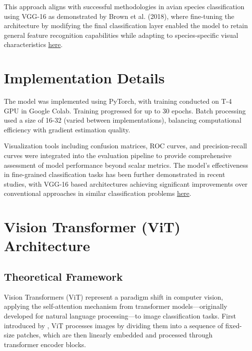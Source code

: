 \documentclass[a4paper,12pt]{article}
\begin{document}
This approach aligns with successful methodologies in avian species classification using VGG-16 as demonstrated by Brown et al. (2018), where fine-tuning the architecture by modifying the final classification layer enabled the model to retain general feature recognition capabilities while adapting to species-specific visual characteristics \href{https://ieeexplore.ieee.org/stamp/stamp.jsp?tp=&arnumber=10533638&tag=}{here}.


\section{Implementation Details}
The model was implemented using PyTorch, with training conducted on T-4 GPU in Google Colab. Training progressed for up to 30 epochs. Batch processing used a size of 16-32 (varied between implementations), balancing computational efficiency with gradient estimation quality.

Visualization tools including confusion matrices, ROC curves, and precision-recall curves were integrated into the evaluation pipeline to provide comprehensive assessment of model performance beyond scalar metrics. The model's effectiveness in fine-grained classification tasks has been further demonstrated in recent studies, with VGG-16 based architectures achieving significant improvements over conventional approaches in similar classification problems \href{https://ieeexplore.ieee.org/stamp/stamp.jsp?tp=&arnumber=10648677&tag=1}{here}.




\section{Vision Transformer (ViT) Architecture}

\subsection{Theoretical Framework}

Vision Transformers (ViT) represent a paradigm shift in computer vision, applying the self-attention mechanism from transformer models—originally developed for natural language processing—to image classification tasks. First introduced by \citep{dosovitskiy2020image}, ViT processes images by dividing them into a sequence of fixed-size patches, which are then linearly embedded and processed through transformer encoder blocks.
\end{document}
